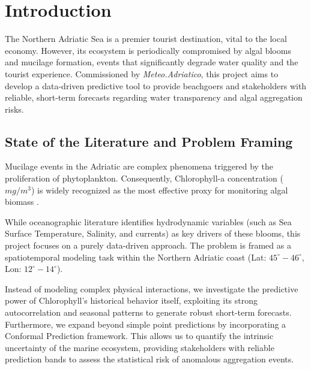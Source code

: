 


\maketitle


\newpage
\section{Introduction}
\label{sec:intro}

The Northern Adriatic Sea is a premier tourist destination, vital to the local economy. However, its ecosystem is periodically compromised by algal blooms and mucilage formation, events that significantly degrade water quality and the tourist experience.
Commissioned by \textit{Meteo.Adriatico}, this project aims to develop a data-driven predictive tool to provide beachgoers and stakeholders with reliable, short-term forecasts regarding water transparency and algal aggregation risks.

\subsection{State of the Literature and Problem Framing}

Mucilage events in the Adriatic are complex phenomena triggered by the proliferation of phytoplankton. Consequently, Chlorophyll-a concentration ($mg/m^3$) is widely recognized as the most effective proxy for monitoring algal biomass \cite{thornton1999prediction}.

While oceanographic literature identifies hydrodynamic variables (such as Sea Surface Temperature, Salinity, and currents) as key drivers of these blooms, this project focuses on a purely data-driven approach. The problem is framed as a spatiotemporal modeling task within the Northern Adriatic coast (Lat: $45^\circ - 46^\circ$, Lon: $12^\circ - 14^\circ$).

Instead of modeling complex physical interactions, we investigate the predictive power of Chlorophyll's historical behavior itself, exploiting its strong autocorrelation and seasonal patterns to generate robust short-term forecasts. Furthermore, we expand beyond simple point predictions by incorporating a Conformal Prediction framework. This allows us to quantify the intrinsic uncertainty of the marine ecosystem, providing stakeholders with reliable prediction bands to assess the statistical risk of anomalous aggregation events.



